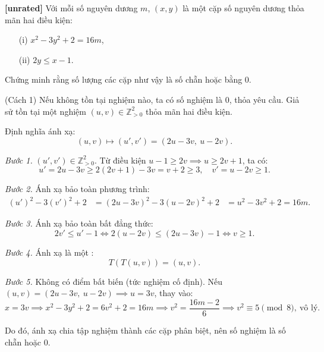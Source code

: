 \documentclass[../04-diophantine-equations.tex]{subfiles}
\begin{document}
\begin{example*}\label{example:KOR-2015-MO-P1}\textbf{[unrated]}
	Với mỗi số nguyên dương \( m \), \( (x, y) \) là một cặp số nguyên dương thỏa mãn hai điều kiện:
	\begin{enumerate}[topsep=0pt, partopsep=0pt, itemsep=0pt]
		\item[(i)] \( x^2 - 3y^2 + 2 = 16m \),
		\item[(ii)] \( 2y \le x - 1 \).
	\end{enumerate}
	Chứng minh rằng số lượng các cặp như vậy là số chẵn hoặc bằng 0.
\end{example*}

\begin{soln}(Cách 1)\footnotemark
	Nếu không tồn tại nghiệm nào, ta có số nghiệm là \( 0 \), thỏa yêu cầu.  
	Giả sử tồn tại một nghiệm \( (u, v) \in \mathbb{Z}_{>0}^2 \) thỏa mãn hai điều kiện.
	
	Định nghĩa ánh xạ:
	\[
		(u, v) \longmapsto (u', v') = (2u - 3v,\ u - 2v).
	\]
	
	\textit{Bước 1.} \( (u', v') \in \mathbb{Z}_{>0}^2 \).  
	Từ điều kiện \( u - 1 \ge 2v \implies u \ge 2v + 1 \), ta có:
	\[
		u' = 2u - 3v \ge 2(2v + 1) - 3v = v + 2 \ge 3,\quad v' = u - 2v \ge 1.
	\]
	
	\textit{Bước 2.} Ánh xạ bảo toàn phương trình:
	\begin{align*}
		(u')^2 - 3(v')^2 + 2 &= (2u - 3v)^2 - 3(u - 2v)^2 + 2
		&= u^2 - 3v^2 + 2 = 16m.
	\end{align*}
	
	\textit{Bước 3.} Ánh xạ bảo toàn bất đẳng thức:
	\[
		2v' \le u' - 1 \Leftrightarrow 2(u - 2v) \le (2u - 3v) - 1 \Leftrightarrow v \ge 1.
	\]
	
	\textit{Bước 4.} Ánh xạ là một :
	\[
		T(T(u, v)) = (u, v).
	\]
	
	\textit{Bước 5.} Không có điểm bất biến (tức nghiệm cố định).
	Nếu \( (u, v) = (2u - 3v,\ u - 2v) \implies u = 3v \), thay vào:
	\[
		x = 3v \implies x^2 - 3y^2 + 2 = 6v^2 + 2 = 16m
		\implies v^2 = \frac{16m - 2}{6} \implies v^2 \equiv 5 \pmod{8},\ \text{vô lý.}
	\]
	
	Do đó, ánh xạ chia tập nghiệm thành các cặp phân biệt, nên số nghiệm là số chẵn hoặc 0.
\end{soln}

\end{document}
